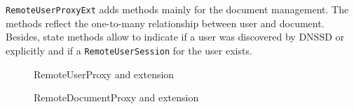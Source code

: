  \texttt{RemoteUserProxyExt} adds methods mainly for the document management. The methods reflect the one-to-many relationship between user and document. Besides, state methods allow to indicate if a user was discovered by DNSSD or explicitly and if a \texttt{RemoteUserSession} for the user exists.

\begin{figure}[H]
 \centering
 \caption{RemoteUserProxy and extension}
 \label{fig:network.discovery.remoteuserproxy.uml}
\end{figure}


\begin{figure}[H]
 \centering
 \caption{RemoteDocumentProxy and extension}
 \label{fig:network.discovery.remotedocumentproxy.uml}
\end{figure}


